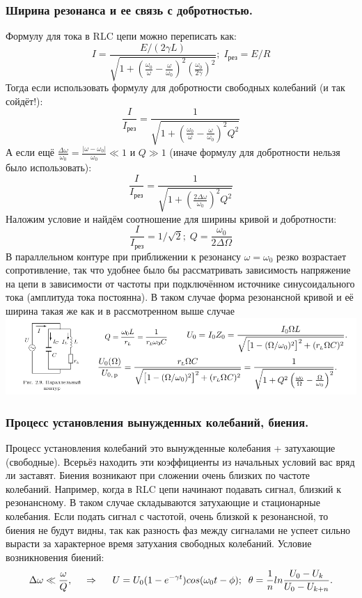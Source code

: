 \subsubsection*{Ширина резонанса и ее связь с добротностью.}
Формулу для тока в RLC цепи можно переписать как:
$$I = \frac{E/(2\gamma L)}{\sqrt{1+(\frac{\omega_0}{\omega} - \frac{\omega}{\omega_0})^2(\frac{\omega_0}{2\gamma})^2}};\;I_{\text{рез}} = E/R$$
Тогда если использовать формулу для добротности свободных колебаний (и так сойдёт!):
$$\frac{I}{I_{\text{рез}}} = \frac{1}{\sqrt{1+(\frac{\omega_0}{\omega} - \frac{\omega}{\omega_0})^2Q^2}}$$
А если ещё $\frac{\Delta\omega}{\omega_0} = \frac{|\omega - \omega_0|}{\omega_0} \ll 1$ и $Q \gg 1$ (иначе формулу для добротности нельзя было использовать):
$$\frac{I}{I_{\text{рез}}} = \frac{1}{\sqrt{1+(\frac{2\Delta\omega}{\omega_0})^2Q^2}}$$
Наложим условие и найдём соотношение для ширины кривой и добротности:
$$\frac{I}{I_{\text{рез}}} =1/\sqrt{2};\;Q=\frac{\omega_0}{2\Delta\Omega}$$
В параллельном контуре при приближении к резонансу $\omega = \omega_0$ резко возрастает сопротивление, так что удобнее было бы рассматривать зависимость напряжение на цепи в зависимости от частоты при подключённом источнике синусоидального тока (амплитуда тока постоянна). В таком случае форма резонансной кривой и её ширина такая же как и в рассмотренном выше случае
\newline
\includegraphics[scale=0.6]{img/ParCircuit.png}
\subsubsection*{Процесс установления вынужденных колебаний, биения.}
Процесс установления колебаний это вынужденные колебания + затухающие (свободные). Всерьёз находить эти коэффициенты из начальных условий вас вряд ли заставят.
\newline
Биения возникают при сложении очень близких по частоте колебаний. Например, когда в RLC цепи начинают подавать сигнал, близкий к резонансному. В таком случае складываются затухающие и стационарные колебания.
\newline
Если подать сигнал с частотой, очень близкой к резонансной, то биения не будут видны, так как разность фаз между сигналами не успеет сильно вырасти за характерное время затухания свободных колебаний.
Условие возникновения биений:
$$\Delta\omega \ll \frac{\omega}{Q},
\hspace{0.5cm} \Rightarrow \hspace{0.5cm} 
U = U_0(1-e^{-\gamma t})cos(\omega_0t-\phi);\;\;\theta = \frac{1}{n}ln\frac{U_0-U_k}{U_0-U_{k+n}}.
$$
